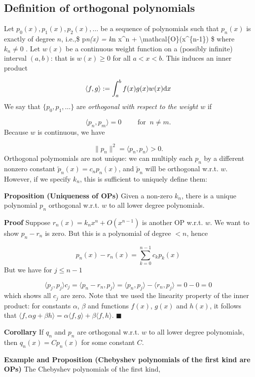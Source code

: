 \documentclass[12pt,a4paper]{article}
\begin{document}
\subsection{Definition of orthogonal polynomials}
Let $p_0(x),p_1(x),p_2(x),\ensuremath{\ldots}$ be a sequence of polynomials such that $p_n(x)$ is exactly of degree $n$, i.e.,\$ p\emph{n(x) = k}n x\^{}n + {\textbackslash}mathcal\{O\}(x\^{}\{n-1\}) \$ where $k_n \neq 0$ .  Let $w(x)$ be a continuous weight function on a (possibly infinite) interval $(a,b)$: that is $w(x) \geq 0$ for all $a < x < b$. This induces an inner product

\[
\langle f,g \rangle := \int_a^b f(x) g(x) w(x) {\rm d}x
\]
We say that $\{p_0, p_1,\ldots\}$ are \emph{orthogonal with respect to the weight $w$} if

\[
\langle p_n,p_m \rangle = 0\qquad \text{ for }\: n \neq m.
\]
Because $w$ is continuous, we have

\[
\| p_n \|^2 = \langle p_n,p_n \rangle > 0 .
\]
Orthogonal polymomials are not unique: we can multiply each $p_n$ by a different nonzero constant $\tilde p_n(x) = c_n p_n(x)$, and $\tilde p_n$ will be orthogonal w.r.t. $w$.  However, if we specify $k_n$, this is sufficient to uniquely define them:

\textbf{Proposition (Uniqueness of OPs)} Given a non-zero $k_n$, there is a unique polynomial $p_n$ orthogonal w.r.t. $w$ to all lower degree polynomials.

\textbf{Proof} Suppose $r_n(x) = k_n x^n + O(x^{n-1})$ is another  OP w.r.t. $w$. We want to show $p_n - r_n$ is zero. But this is a polynomial of degree $<n$, hence

\[
p_n(x) - r_n(x) = \sum_{k=0}^{n-1} c_k p_k(x)
\]
But we have for $j \leq n-1$

\[
\langle p_j,p_j \rangle c_j = \langle p_n - r_n, p_j \rangle = \langle p_n,p_j \rangle - \langle r_n, p_j\rangle = 0 - 0 = 0
\]
which shows all $c_j$ are zero.  Note that we used the linearity property of the inner product: for constants $\alpha$, $\beta$ and functions $f(x)$, $g(x)$ and $h(x)$, it follows that $\langle  f,\alpha g + \beta h\rangle = \alpha\langle f, g\rangle + \beta\langle f, h \rangle $.  $\blacksquare$

\textbf{Corollary} If $q_n$ and $p_n$ are orthogonal w.r.t. $w$ to all lower degree polynomials, then $q_n(x) = C p_n(x)$ for some constant $C$.

\textbf{Example and Proposition (Chebyshev polynomials of the first kind are OPs)} The Chebyshev polynomials of the first kind,
\end{document}
